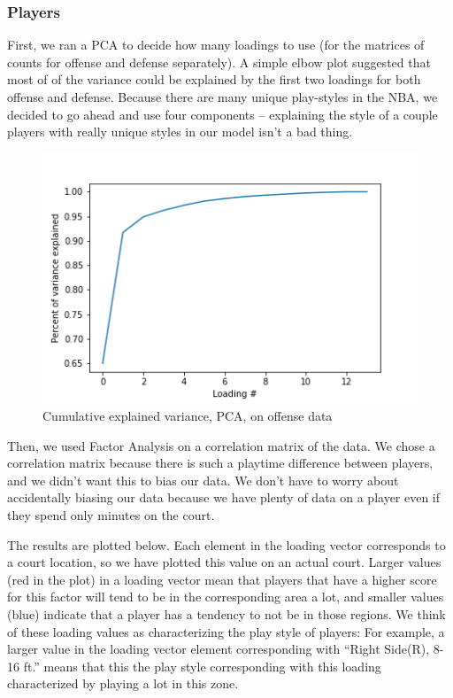 \documentclass[]{article}
\begin{document}
\hypertarget{players}{%
\subsubsection{Players}\label{players}}

First, we ran a PCA to decide how many loadings to use (for the matrices
of counts for offense and defense separately). A simple elbow plot
suggested that most of of the variance could be explained by the first
two loadings for both offense and defense. Because there are many unique
play-styles in the NBA, we decided to go ahead and use four components
-- explaining the style of a couple players with really unique styles in
our model isn't a bad thing.

\begin{figure}
\centering
\includegraphics{cum_pca_offense.png}
\caption{Cumulative explained variance, PCA, on offense data}
\end{figure}

Then, we used Factor Analysis on a correlation matrix of the data. We
chose a correlation matrix because there is such a playtime difference
between players, and we didn't want this to bias our data. We don't have
to worry about accidentally biasing our data because we have plenty of
data on a player even if they spend only minutes on the court.

The results are plotted below. Each element in the loading vector
corresponds to a court location, so we have plotted this value on an
actual court. Larger values (red in the plot) in a loading vector mean
that players that have a higher score for this factor will tend to be in
the corresponding area a lot, and smaller values (blue) indicate that a
player has a tendency to not be in those regions. We think of these
loading values as characterizing the play style of players: For example,
a larger value in the loading vector element corresponding with ``Right
Side(R), 8-16 ft.'' means that this the play style corresponding with
this loading characterized by playing a lot in this zone.
\end{document}
